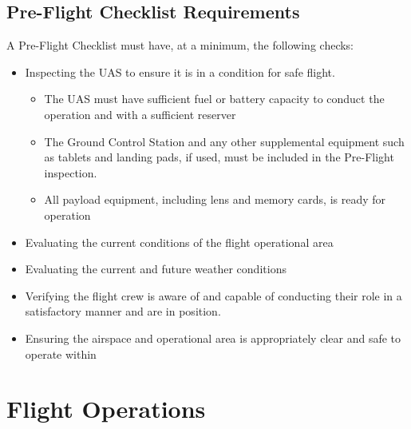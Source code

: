\documentclass[
]{book}
\providecommand{\tightlist}{%
  \setlength{\itemsep}{0pt}\setlength{\parskip}{0pt}}
\begin{document}
\hypertarget{pre-flight-checklist-requirements}{%
\subsection{Pre-Flight Checklist Requirements}\label{pre-flight-checklist-requirements}}

A Pre-Flight Checklist must have, at a minimum, the following checks:

\begin{itemize}
\item
  Inspecting the UAS to ensure it is in a condition for safe flight.

  \begin{itemize}
  \tightlist
  \item
    The UAS must have sufficient fuel or battery capacity to conduct the operation and with a sufficient reserver
  \item
    The Ground Control Station and any other supplemental equipment such as tablets and landing pads, if used, must be included in the Pre-Flight inspection.
  \item
    All payload equipment, including lens and memory cards, is ready for operation
  \end{itemize}
\item
  Evaluating the current conditions of the flight operational area
\item
  Evaluating the current and future weather conditions
\item
  Verifying the flight crew is aware of and capable of conducting their role in a satisfactory manner and are in position.
\item
  Ensuring the airspace and operational area is appropriately clear and safe to operate within
\end{itemize}

\hypertarget{flight-operations}{%
\section{Flight Operations}\label{flight-operations}}
\end{document}
